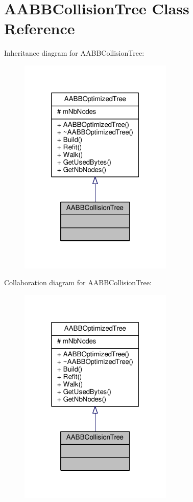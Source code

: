 \hypertarget{classAABBCollisionTree}{}\section{A\+A\+B\+B\+Collision\+Tree Class Reference}
\label{classAABBCollisionTree}


Inheritance diagram for A\+A\+B\+B\+Collision\+Tree\+:
\nopagebreak
\begin{figure}[H]
\begin{center}
\leavevmode
\includegraphics[width=208pt]{de/ded/classAABBCollisionTree__inherit__graph}
\end{center}
\end{figure}


Collaboration diagram for A\+A\+B\+B\+Collision\+Tree\+:
\nopagebreak
\begin{figure}[H]
\begin{center}
\leavevmode
\includegraphics[width=208pt]{dd/d9e/classAABBCollisionTree__coll__graph}
\end{center}
\end{figure}
